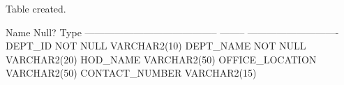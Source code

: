 \vspace{24pt}


\begin{sqlout}
Table created.

 Name                                      Null?    Type
 ----------------------------------------- -------- ----------------------------
 DEPT_ID                                   NOT NULL VARCHAR2(10)
 DEPT_NAME                                 NOT NULL VARCHAR2(20)
 HOD_NAME                                           VARCHAR2(50)
 OFFICE_LOCATION                                    VARCHAR2(50)
 CONTACT_NUMBER                                     VARCHAR2(15)
\end{sqlout}

\clearpage
